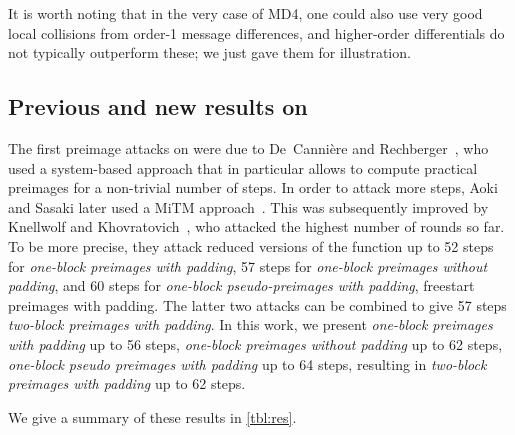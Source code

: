 It is worth noting that in the very case of MD4, one could also use very
good local collisions from order-1 message differences, and higher-order differentials do not typically outperform these; we just
gave them for illustration.

\subsection{Previous and new results on \shaone}
The first preimage attacks on \shaone were due to De~Canni\`ere and Rechberger~\cite{DBLP:conf/crypto/CanniereR08},
who used a system-based approach that in particular allows to compute practical preimages for a non-trivial
number of steps. In order to attack more steps, Aoki and Sasaki later used a MiTM approach~\cite{AS09}.
This was subsequently improved by Knellwolf and Khovratovich~\cite{DBLP:conf/crypto/KnellwolfK12}, who attacked the highest number
of rounds so far. To be more precise,
they attack reduced versions of the function up to 52 steps for \emph{one-block preimages with padding},
57 steps for \emph{one-block preimages without padding}, and 60 steps for \emph{one-block pseudo-preimages
with padding}, \ie freestart preimages with padding. The latter two attacks can be combined to give 57 steps \emph{two-block preimages with padding}.
In this work, we present \emph{one-block preimages with padding} up to 56 steps,
\emph{one-block preimages without padding} up to 62 steps, \emph{one-block pseudo preimages with padding} up
to 64 steps, resulting in \emph{two-block preimages with padding} up to 62 steps.

We give a summary of these results in \autoref{tbl:res}.

